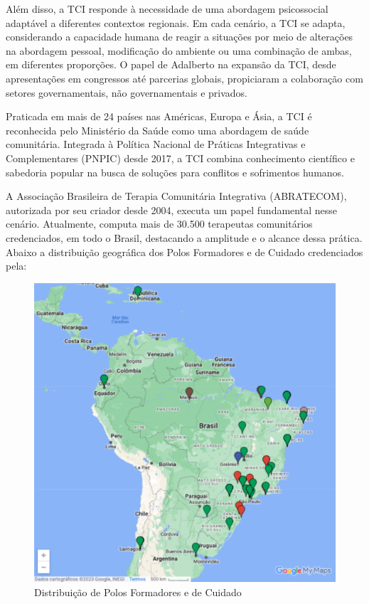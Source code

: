         Além disso, a TCI responde à necessidade de uma abordagem psicossocial adaptável a diferentes contextos regionais. Em cada cenário, a TCI se adapta, considerando a capacidade humana de reagir a situações por meio de alterações na abordagem pessoal, modificação do ambiente ou uma combinação de ambas, em diferentes proporções.\cite{DANTAS} O papel de Adalberto na expansão da TCI, desde apresentações em congressos até parcerias globais, propiciaram a colaboração com setores governamentais, não governamentais e privados.\cite{GOMES}
        
        Praticada em mais de 24 países nas Américas, Europa e Ásia, a TCI é reconhecida pelo Ministério da Saúde como uma abordagem de saúde comunitária. Integrada à Política Nacional de Práticas Integrativas e Complementares (PNPIC) desde 2017, a TCI combina conhecimento científico e sabedoria popular na busca de soluções para conflitos e sofrimentos humanos.\cite{ABRATECOM}
        
        A Associação Brasileira de Terapia Comunitária Integrativa (ABRATECOM), autorizada por seu criador desde 2004, executa um papel fundamental nesse cenário. Atualmente, computa mais de 30.500 terapeutas comunitários credenciados, em todo o Brasil, destacando a amplitude e o alcance dessa prática.\cite{SILVAFRANCO} Abaixo a distribuição geográfica dos Polos Formadores e de Cuidado credenciados pela\cite{ABRATECOM}:
        
            \begin{figure}[!h] %
                \centering
                \includegraphics[scale=0.7]{latex/figuras/polos.pdf}
                \caption[Terapia Comunitária Integrativa]%
                {Distribuição de Polos Formadores e de Cuidado}%
            \end{figure}
        
